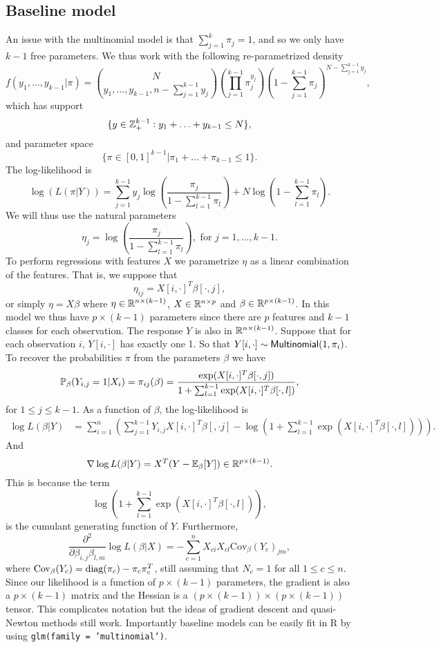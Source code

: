 \subsection{Baseline model}
An issue with the multinomial model is that $\sum_{j=1}^k \pi_j = 1$, and so we only have $k-1$ free parameters. We thus work with the following re-parametrized density
\[f(y_1,\ldots,y_{k-1}|\pi) = \binom{N}{y_1,\ldots,y_{k-1},n-\sum_{j=1}^{k-1}y_j} \left(\prod_{j=1}^{k-1}\pi_j^{y_j}\right)\left(1-\sum_{j=1}^{k-1}\pi_j\right)^{N-\sum_{j=1}^{k-1}y_{j}},\]
which has support $$\{y \in {{\mathbb Z}}_+^{k-1}:y_1+\ldots +y_{k-1} \le N\},$$ and parameter space $$\{ \pi \in [0,1]^{k-1}|\pi_1+\ldots+\pi_{k-1}\le 1\}.$$
The log-likelihood is
\[\log(L(\pi|Y)) = \sum_{j=1}^{k-1}y_j \log\left(\frac{\pi_j}{1-\sum_{l=1}^{k-1}\pi_l}\right)+N\log\left(1-\sum_{l=1}^{k-1}\pi_l\right). \]
We will thus use the natural parameters
\[\eta_j = \log\left(\frac{\pi_j}{1-\sum_{l=1}^{k-1}\pi_l}\right), \text{ for } j =1,\ldots,k-1.\]
To perform regressions with features $X$ we parametrize $\eta$ as a linear combination of the features. That is, we suppose that 
\[\eta_{ij} = X[i,\cdot]^T \beta[\cdot,j], \]
or simply $\eta = X\beta$ where $\eta \in {\mathbb R}^{n \times (k-1)}$, $X \in {\mathbb R}^{n \times p}$ and $\beta \in {\mathbb R}^{p \times (k-1)}$. In this model we thus have $p\times(k-1)$ parameters since there are $p$ features and $k-1$ classes for each observation. The response $Y$ is also in ${\mathbb R}^{n \times (k-1)}$. Suppose that for each observation $i$, $Y[i,\cdot]$ has exactly one 1. So that $Y[i,\cdot] \sim \mathsf{Multinomial}(1,\pi_i)$.  To recover the probabilities $\pi$ from the parameters $\beta$ we have
\[{\mathbb{P}}_\beta(Y_{i,j} = 1|X_i) = \pi_{ij}(\beta) = \frac{\exp(X[i,\cdot]^T\beta[\cdot,j])}{1+\sum_{l=1}^{k-1}\exp(X[i,\cdot]^T\beta[\cdot,l])}, \]
for $1 \le j \le k-1$. As a function of $\beta$, the log-likelihood is
\begin{align*}
    \log L(\beta|Y) &= \sum_{i=1}^n \left(\sum_{j=1}^{k-1}Y_{i,j}X[i,\cdot]^T\beta[,\cdot j] - \log\left(1+\sum_{l=1}^{k-1}\exp(X[i,\cdot]^T\beta[\cdot,l])\right)\right).\end{align*}
    And
    \[\nabla \log L(\beta|Y) = X^T(Y - {\mathbb{E}}_\beta[Y]) \in {\mathbb R}^{p\times (k-1)}.\]
    This is because the term 
    \[\log\left(1+\sum_{l=1}^{k-1}\exp(X[i,\cdot]^T\beta[\cdot,l])\right),\]
    is the cumulant generating function of $Y$. Furthermore,
    \[\frac{\partial^2}{\partial \beta_{i,j}\beta_{l,m}} \log L(\beta|X) =-\sum_{c=1}^n X_{ci}X_{cl} \text{Cov}_\beta(Y_c)_{jm}, \]
where $\text{Cov}_\beta(Y_c) = \operatorname{diag}(\pi_c)-\pi_c\pi_c^T$, still assuming that $N_c=1$ for all $1\le c\le n$. Since our likelihood is a function of $p \times (k-1)$ parameters, the gradient is also a $p \times (k-1)$ matrix and the Hessian is a $(p \times (k-1)) \times (p \times (k-1))$ tensor. This complicates notation but the ideas of gradient descent and quasi-Newton methods still work. Importantly baseline models can be easily fit in R by using \texttt{glm(family = 'multinomial')}. 
